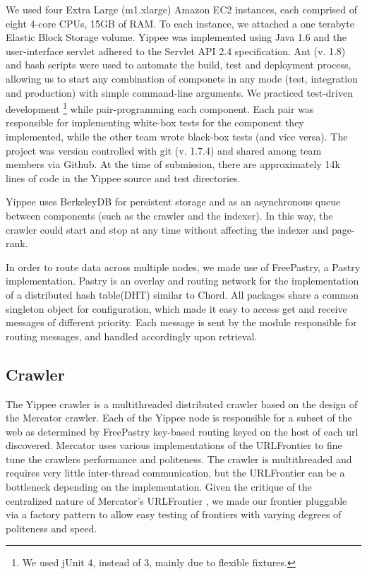 \documentclass[11pt, letterpaper, oneside, twocolumn]{article}
\begin{document}
We used four Extra Large (m1.xlarge) Amazon EC2 instances, each comprised of eight 4-core CPUs, 15GB of RAM.
To each instance, we attached a one terabyte Elastic Block Storage volume. 
Yippee was implemented using Java 1.6 and the user-interface servlet adhered to the Servlet API 2.4 specification. 
Ant (v. 1.8) and bash scripts were used to automate the build, test and deployment process, allowing us to start any combination of componets in any mode (test, integration and production) with simple command-line arguments.
We practiced test-driven development \footnote{We used jUnit 4, instead of 3, mainly due to flexible fixtures.} while pair-programming each component.  Each pair was responsible for implementing white-box tests for the component they implemented, while the other team wrote black-box tests (and vice versa). 
The project was version controlled with git (v. 1.7.4) and shared among team members via Github.
At the time of submission, there are approximately 14k lines of code in the Yippee source and test directories.

Yippee uses BerkeleyDB for persistent storage and as an asynchronous queue between components (such as the crawler and the indexer). In this way, the crawler could start and stop at any time without affecting the indexer and page-rank.  

In order to route data across multiple nodes, we made use of FreePastry, a Pastry implementation. 
Pastry is an overlay and routing network for the implementation of a distributed hash table(DHT) similar to Chord. 
All packages share a common singleton object for configuration, which made it easy to access get and receive messages of different priority. 
Each message is sent by the module responsible for routing messages, and handled accordingly upon retrieval.

\subsection{Crawler}

The Yippee crawler is a multithreaded distributed crawler based on the design of the Mercator crawler\cite{mercator}. 
Each of the Yippee node is responsible for a subset of the web as determined by FreePastry key-based routing keyed on the host of each url discovered.
Mercator uses various implementations of the URLFrontier to fine tune the crawlers performance and politeness.
The crawler is multithreaded and requires very little inter-thread communication, but the URLFrontier can be a bottleneck depending on the implementation. 
Given the critique of the centralized nature of Mercator's URLFrontier \cite{ubi, para}, we made our frontier pluggable via a factory pattern to allow easy testing of frontiers with varying degrees of politeness and speed.
\end{document}
